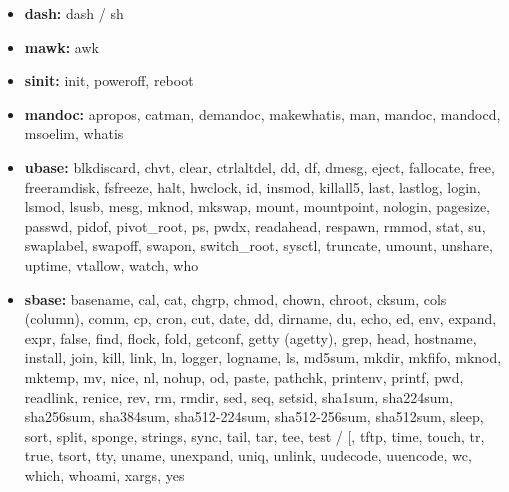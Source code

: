 \begin{itemize}
    \item \textbf{dash:} dash / sh 
    \item \textbf{mawk:} awk
    \item \textbf{sinit:} init, poweroff, reboot
    \item \textbf{mandoc:} apropos, catman, demandoc, makewhatis, man, mandoc, mandocd, msoelim, whatis
    \item \textbf{ubase:} blkdiscard, chvt, clear, ctrlaltdel, dd, df, dmesg, eject, fallocate, free, freeramdisk, fsfreeze, halt, hwclock, id, insmod, killall5, last, lastlog, login, lsmod, lsusb, mesg, mknod, mkswap, mount, mountpoint, nologin, pagesize, passwd, pidof, pivot\_root, ps, pwdx, readahead, respawn, rmmod, stat, su, swaplabel, swapoff, swapon, switch\_root, sysctl, truncate, umount, unshare, uptime, vtallow, watch, who
    \item \textbf{sbase:} basename, cal, cat, chgrp, chmod, chown, chroot, cksum, cols (column), comm, cp, cron, cut, date, dd, dirname, du, echo, ed, env, expand, expr, false, find, flock, fold, getconf, getty (agetty), grep, head, hostname, install, join, kill, link, ln, logger, logname, ls, md5sum, mkdir, mkfifo, mknod, mktemp, mv, nice, nl, nohup, od, paste, pathchk, printenv, printf, pwd, readlink, renice, rev, rm, rmdir, sed, seq, setsid, sha1sum, sha224sum, sha256sum, sha384sum, sha512-224sum, sha512-256sum, sha512sum, sleep, sort, split, sponge, strings, sync, tail, tar, tee, test / [, tftp, time, touch, tr, true, tsort, tty, uname, unexpand, uniq, unlink, uudecode, uuencode, wc, which, whoami, xargs, yes
\end{itemize}
